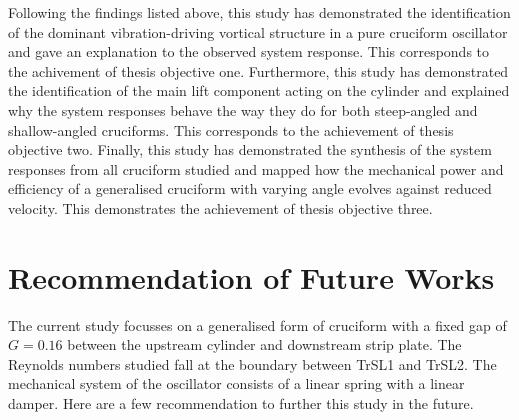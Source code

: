 \documentclass[oneside]{utmthesis}
\begin{document}

Following the findings listed above, this study has demonstrated the  identification of the dominant vibration-driving vortical structure in a pure cruciform oscillator and gave an explanation to the observed system response. This corresponds to the achivement of thesis objective one. Furthermore, this study has demonstrated the identification of the main lift component acting on the cylinder and explained why the system responses behave the way they do for both steep-angled and shallow-angled cruciforms. This corresponds to the achievement of thesis objective two. Finally, this study has demonstrated the synthesis of the system responses from all cruciform studied and mapped how the mechanical power and efficiency of a generalised cruciform with varying angle evolves against reduced velocity. This demonstrates the achievement of thesis objective three.

\section{Recommendation of Future Works} \label{sec:concFutureWorks}

\vspace{\baselineskip}

The current study focusses on a generalised form of cruciform with a fixed gap of $G = 0.16$ between the upstream cylinder and downstream strip plate. The Reynolds numbers studied fall at the boundary between TrSL1 and TrSL2. The mechanical system of the oscillator consists of a linear spring with a linear damper. Here are a few recommendation to further this study in the future.
\end{document}
